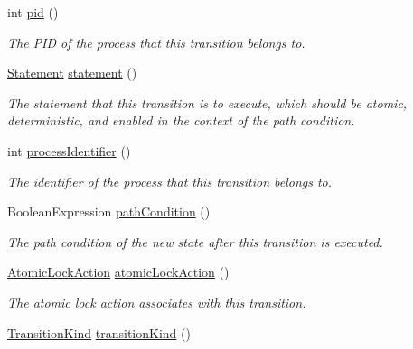 \begin{DoxyCompactItemize}
\item 
int \hyperlink{classedu_1_1udel_1_1cis_1_1vsl_1_1civl_1_1semantics_1_1common_1_1CommonTransition_af453ed61097a4033a692d0356ca17d5c}{pid} ()
\begin{DoxyCompactList}\small\item\em The P\+I\+D of the process that this transition belongs to. \end{DoxyCompactList}\item 
\hyperlink{interfaceedu_1_1udel_1_1cis_1_1vsl_1_1civl_1_1model_1_1IF_1_1statement_1_1Statement}{Statement} \hyperlink{classedu_1_1udel_1_1cis_1_1vsl_1_1civl_1_1semantics_1_1common_1_1CommonTransition_a4fe8647966399674f07d21f97c9f333c}{statement} ()
\begin{DoxyCompactList}\small\item\em The statement that this transition is to execute, which should be atomic, deterministic, and enabled in the context of the path condition. \end{DoxyCompactList}\item 
int \hyperlink{classedu_1_1udel_1_1cis_1_1vsl_1_1civl_1_1semantics_1_1common_1_1CommonTransition_acc6b0ad6ebf33af88df194deaf5e2830}{process\+Identifier} ()
\begin{DoxyCompactList}\small\item\em The identifier of the process that this transition belongs to. \end{DoxyCompactList}\item 
Boolean\+Expression \hyperlink{classedu_1_1udel_1_1cis_1_1vsl_1_1civl_1_1semantics_1_1common_1_1CommonTransition_a7d3c59c72d641a9e85c8b6001eaa4383}{path\+Condition} ()
\begin{DoxyCompactList}\small\item\em The path condition of the new state after this transition is executed. \end{DoxyCompactList}\item 
\hyperlink{enumedu_1_1udel_1_1cis_1_1vsl_1_1civl_1_1semantics_1_1IF_1_1Transition_1_1AtomicLockAction}{Atomic\+Lock\+Action} \hyperlink{classedu_1_1udel_1_1cis_1_1vsl_1_1civl_1_1semantics_1_1common_1_1CommonTransition_a1e45372281183d46f2577f91debad491}{atomic\+Lock\+Action} ()
\begin{DoxyCompactList}\small\item\em The atomic lock action associates with this transition. \end{DoxyCompactList}\item 
\hyperlink{enumedu_1_1udel_1_1cis_1_1vsl_1_1civl_1_1semantics_1_1IF_1_1Transition_1_1TransitionKind}{Transition\+Kind} \hyperlink{classedu_1_1udel_1_1cis_1_1vsl_1_1civl_1_1semantics_1_1common_1_1CommonTransition_ae3af0e33ad3e419cc5b5de3417f3cdf1}{transition\+Kind} ()

\end{DoxyCompactItemize}
